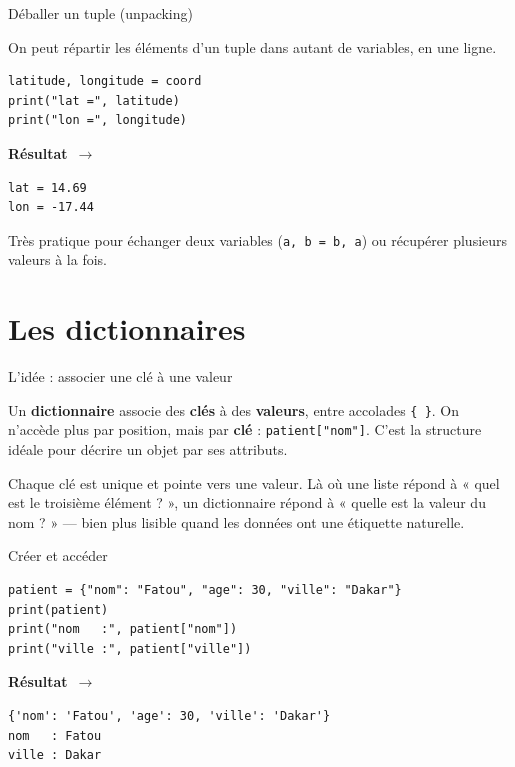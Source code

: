 \documentclass[aspectratio=169,11pt]{beamer}
\newcommand{\resultat}{{\scriptsize\textbf{R\'esultat}~$\rightarrow$}\par\vspace{1pt}}
\begin{document}
\begin{frame}[fragile]{Déballer un tuple (unpacking)}
\begin{ucadex}
{\small On peut répartir les éléments d'un tuple dans autant de variables, en une ligne.}
\end{ucadex}
\begin{lstlisting}
latitude, longitude = coord
print("lat =", latitude)
print("lon =", longitude)
\end{lstlisting}
\resultat
\begin{lstlisting}[style=out]
lat = 14.69
lon = -17.44
\end{lstlisting}
{\small Très pratique pour échanger deux variables (\texttt{a, b = b, a}) ou récupérer plusieurs valeurs à la fois.}
\end{frame}

\section{Les dictionnaires}

\begin{frame}{L'idée : associer une clé à une valeur}
\begin{ucaddef}
{\small Un \textbf{dictionnaire} associe des \textbf{clés} à des \textbf{valeurs}, entre accolades \texttt{\{ \}}. On n'accède plus par position, mais par \textbf{clé} : \texttt{patient["nom"]}. C'est la structure idéale pour décrire un objet par ses attributs.}
\end{ucaddef}
{\small Chaque clé est unique et pointe vers une valeur. Là où une liste répond à « quel est le troisième élément ? », un dictionnaire répond à « quelle est la valeur du nom ? » — bien plus lisible quand les données ont une étiquette naturelle.}
\end{frame}

\begin{frame}[fragile]{Créer et accéder}
\begin{lstlisting}
patient = {"nom": "Fatou", "age": 30, "ville": "Dakar"}
print(patient)
print("nom   :", patient["nom"])
print("ville :", patient["ville"])
\end{lstlisting}
\resultat
\begin{lstlisting}[style=out]
{'nom': 'Fatou', 'age': 30, 'ville': 'Dakar'}
nom   : Fatou
ville : Dakar
\end{lstlisting}
\end{frame}
\end{document}
